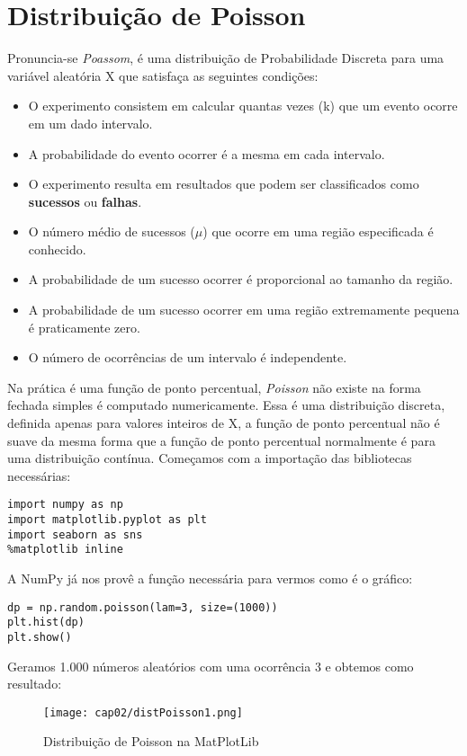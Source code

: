\section{Distribuição de Poisson}
Pronuncia-se \textit{Poassom}, é uma distribuição de Probabilidade Discreta para uma variável aleatória X que satisfaça as seguintes condições:
\vspace{-1em}
\begin{itemize}[noitemsep]
	\item O experimento consistem em calcular quantas vezes (k) que um evento ocorre em um dado intervalo.
	\item A probabilidade do evento ocorrer é a mesma em cada intervalo.
	\item O experimento resulta em resultados que podem ser classificados como \textbf{sucessos} ou \textbf{falhas}.
	\item O número médio de sucessos ($\mu$) que ocorre em uma região especificada é conhecido.
	\item A probabilidade de um sucesso ocorrer é proporcional ao tamanho da região.
	\item A probabilidade de um sucesso ocorrer em uma região extremamente pequena é praticamente zero.
	\item O número de ocorrências de um intervalo é independente.
\end{itemize}

Na prática é uma função de ponto percentual, \textit{Poisson} não existe na forma fechada simples é computado numericamente. Essa é uma distribuição discreta, definida apenas para valores inteiros de X, a função de ponto percentual não é suave da mesma forma que a função de ponto percentual normalmente é para uma distribuição contínua. Começamos com a importação das bibliotecas necessárias:
\begin{lstlisting}
import numpy as np
import matplotlib.pyplot as plt
import seaborn as sns
%matplotlib inline
\end{lstlisting}

A NumPy já nos provê a função necessária para vermos como é o gráfico:
\begin{lstlisting}
dp = np.random.poisson(lam=3, size=(1000))
plt.hist(dp)
plt.show()
\end{lstlisting}

Geramos 1.000 números aleatórios com uma ocorrência 3 e obtemos como resultado:
\begin{figure}[H]
	\centering
	\texttt{[image: cap02/distPoisson1.png]}
	\caption{Distribuição de Poisson na MatPlotLib}
\end{figure}

